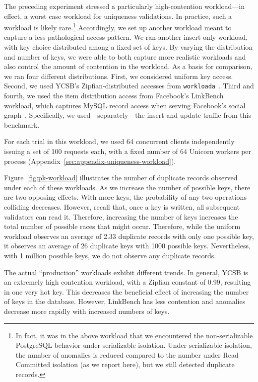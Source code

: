  The preceding experiment stressed a
particularly high-contention workload---in effect, a worst case
workload for uniqueness validations. In practice, such a workload is
likely rare.\footnote{In fact, it was in the above workload that we
  encountered the non-serializable PostgreSQL behavior under
  serializable isolation. Under serializable isolation, the number of
  anomalies is reduced compared to the number under Read Committed
  isolation (as we report here), but we still detected duplicate
  records.} Accordingly, we set up another workload meant to capture a
less pathological access pattern. We ran another insert-only workload,
with key choice distributed among a fixed set of keys. By varying the
distribution and number of keys, we were able to both capture more
realistic workloads and also control the amount of contention in the
workload. As a basis for comparison, we ran four different
distributions. First, we considered uniform key access. Second, we
used YCSB's Zipfian-distributed accesses from
\texttt{workloada}~\cite{ycsb}. Third and fourth, we used the item
distribution access from Facebook's LinkBench workload, which captures
MySQL record access when serving Facebook's social
graph~\cite{linkbench}. Specifically, we used---separately---the
insert and update traffic from this benchmark.

For each trial in this workload, we used 64 concurrent clients
independently issuing a set of 100 requests each, with a fixed number
of 64 Unicorn workers per process (Appendix~\ref{sec:appendix-uniqueness-workload}). 

Figure~\ref{fig:pk-workload} illustrates the number of duplicate
records observed under each of these workloads. As we increase the
number of possible keys, there are two opposing effects. With
more keys, the probability of any two operations colliding
decreases. However, recall that, once a key is written, all subsequent
validators can read it. Therefore, increasing the number of keys
increases the total number of possible races that might
occur. Therefore, while the uniform workload observes an average of
2.33 duplicate records with only one possible key, it observes an average of 26
duplicate keys with 1000 possible keys. Nevertheless, with 1 million possible
keys, we do not observe any duplicate records.

The actual ``production'' workloads exhibit different trends. In
general, YCSB is an extremely high contention workload, with a Zipfian
constant of 0.99, resulting in one very hot key. This decreases the
beneficial effect of increasing the number of keys in the
database. However, LinkBench has less contention and anomalies decrease more
rapidly with increased numbers of keys.

